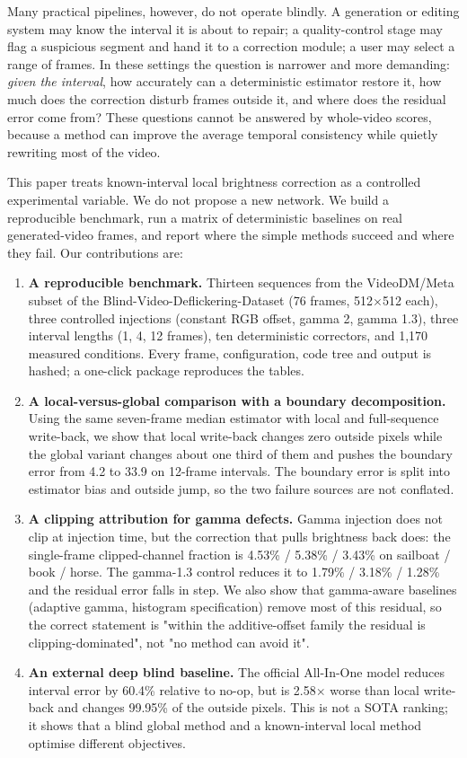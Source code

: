 \documentclass[twocolumn,10pt]{svjour3}
\begin{document}
Many practical pipelines, however, do not operate blindly. A generation or editing system may know the interval it is about to repair; a quality-control stage may flag a suspicious segment and hand it to a correction module; a user may select a range of frames. In these settings the question is narrower and more demanding: \emph{given the interval}, how accurately can a deterministic estimator restore it, how much does the correction disturb frames outside it, and where does the residual error come from? These questions cannot be answered by whole-video scores, because a method can improve the average temporal consistency while quietly rewriting most of the video.


This paper treats known-interval local brightness correction as a controlled experimental variable. We do not propose a new network. We build a reproducible benchmark, run a matrix of deterministic baselines on real generated-video frames, and report where the simple methods succeed and where they fail. Our contributions are:


\begin{enumerate}
\item \textbf{A reproducible benchmark.} Thirteen sequences from the VideoDM/Meta subset of the Blind-Video-Deflickering-Dataset (76 frames, 512$\times$512 each), three controlled injections (constant RGB offset, gamma 2, gamma 1.3), three interval lengths (1, 4, 12 frames), ten deterministic correctors, and 1,170 measured conditions. Every frame, configuration, code tree and output is hashed; a one-click package reproduces the tables.
\item \textbf{A local-versus-global comparison with a boundary decomposition.} Using the same seven-frame median estimator with local and full-sequence write-back, we show that local write-back changes zero outside pixels while the global variant changes about one third of them and pushes the boundary error from 4.2 to 33.9 on 12-frame intervals. The boundary error is split into estimator bias and outside jump, so the two failure sources are not conflated.
\item \textbf{A clipping attribution for gamma defects.} Gamma injection does not clip at injection time, but the correction that pulls brightness back does: the single-frame clipped-channel fraction is 4.53\% / 5.38\% / 3.43\% on sailboat / book / horse. The gamma-1.3 control reduces it to 1.79\% / 3.18\% / 1.28\% and the residual error falls in step. We also show that gamma-aware baselines (adaptive gamma, histogram specification) remove most of this residual, so the correct statement is "within the additive-offset family the residual is clipping-dominated", not "no method can avoid it".
\item \textbf{An external deep blind baseline.} The official All-In-One model reduces interval error by 60.4\% relative to no-op, but is 2.58$\times$ worse than local write-back and changes 99.95\% of the outside pixels. This is not a SOTA ranking; it shows that a blind global method and a known-interval local method optimise different objectives.
\end{enumerate}
\end{document}
